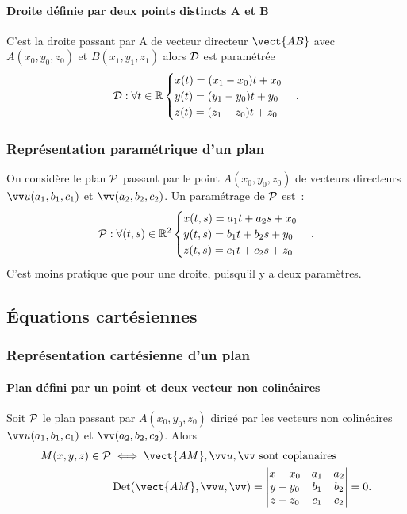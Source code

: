 \paragraph{Droite définie par deux points distincts A et B}
C'est la droite passant par A de vecteur directeur $\vect{AB}$ avec $A(x_0,y_0,z_0)$ et $B(x_1,y_1,z_1)$ alors $\Dr$ est paramétrée
\begin{equation}
  \Dr : \forall t\in\R
  \begin{cases}
    x(t)=(x_1-x_0)t+x_0\\y(t)=(y_1-y_0)t+y_0\\z(t)=(z_1-z_0)t+z_0
  \end{cases}.
\end{equation}

\subsubsection{Représentation paramétrique d'un plan}
On considère le plan $\P$ passant par le point $A(x_0,y_0,z_0)$ de vecteurs directeurs $\vu(a_1,b_1,c_1)$ et $\vv(a_2,b_2,c_2)$. Un paramétrage de $\P$ est~:
\begin{equation}
  \P : \forall (t,s)\in\R^2
  \begin{cases}
    x(t,s)=a_1t+a_2s+x_0\\y(t,s)=b_1t+b_2s+y_0\\z(t,s)=c_1t+c_2s+z_0
  \end{cases}.
\end{equation}
C'est moins pratique que pour une droite, puisqu'il y a deux paramètres.

\subsection{Équations cartésiennes}

\subsubsection{Représentation cartésienne d'un plan}

\paragraph{Plan défini par un point et deux vecteur non colinéaires}

Soit $\P$ le plan passant par $A(x_0,y_0,z_0)$ dirigé par les vecteurs non colinéaires $\vu(a_1,b_1,c_1)$ et $\vv(a_2,b_2,c_2)$. Alors
\begin{align}
  M(x,y,z) \in \P &\iff  \vect{AM}, \vu, \vv \text{~sont coplanaires}\\
  &\Det(\vect{AM},\vu,\vv)=\begin{vmatrix} x-x_0 & a_1 & a_2 \\ y-y_0 & b_1 & b_2 \\ z-z_0 & c_1 & c_2\end{vmatrix}=0.
\end{align}

